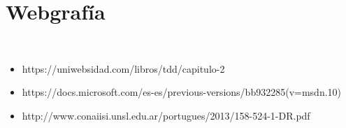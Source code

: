 \section{Webgrafía} 
\textbf{}\\
\begin{flushleft}

\begin{itemize}

	\item https://uniwebsidad.com/libros/tdd/capitulo-2
           \item https://docs.microsoft.com/es-es/previous-versions/bb932285(v=msdn.10)
           \item http://www.conaiisi.unsl.edu.ar/portugues/2013/158-524-1-DR.pdf

\end{itemize} 


\end{flushleft}